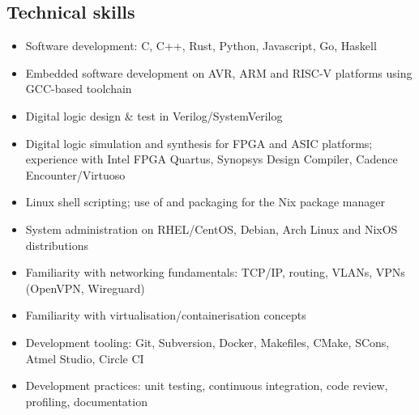 
\vspace{-1.2em}

\subsection*{Technical skills}

\begin{itemize}
  \item Software development: C, C++, Rust, Python, Javascript, Go, Haskell
  \item Embedded software development on AVR, ARM and RISC-V platforms using GCC-based toolchain
  \item Digital logic design \& test in Verilog/SystemVerilog
  \item Digital logic simulation and synthesis for FPGA and ASIC platforms; experience with Intel FPGA Quartus, Synopsys Design Compiler, Cadence Encounter/Virtuoso
  \item Linux shell scripting; use of and packaging for the Nix package manager
  \item System administration on RHEL/CentOS, Debian, Arch Linux and NixOS distributions
  \item Familiarity with networking fundamentals: TCP/IP, routing, VLANs, VPNs (OpenVPN, Wireguard)
  \item Familiarity with virtualisation/containerisation concepts
  \item Development tooling: Git, Subversion, Docker, Makefiles, CMake, SCons, Atmel Studio, Circle CI
  \item Development practices: unit testing, continuous integration, code review, profiling, documentation
\end{itemize}
